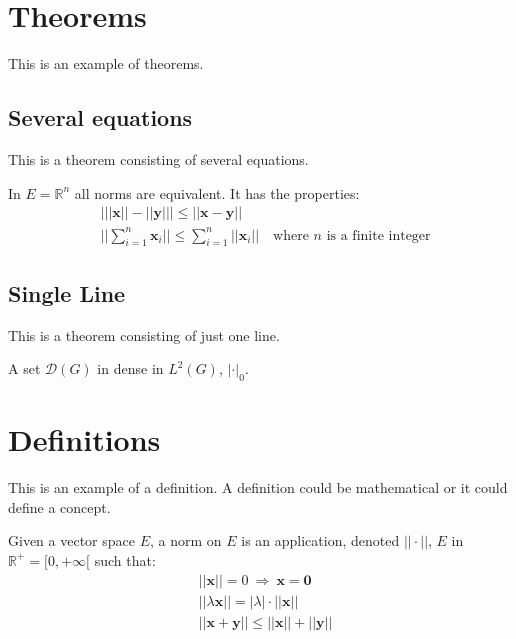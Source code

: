 \documentclass[11pt,fleqn]{book} %
\begin{document}
\section{Theorems}

This is an example of theorems.

\subsection{Several equations}
This is a theorem consisting of several equations.

\begin{theorem}
In $E=\mathbb{R}^n$ all norms are equivalent. It has the properties:
\begin{align}
& \big| ||\mathbf{x}|| - ||\mathbf{y}|| \big|\leq || \mathbf{x}- \mathbf{y}||\\
&  ||\sum_{i=1}^n\mathbf{x}_i||\leq \sum_{i=1}^n||\mathbf{x}_i||\quad\text{where $n$ is a finite integer}
\end{align}
\end{theorem}

\subsection{Single Line}
This is a theorem consisting of just one line.

\begin{theorem}
A set $\mathcal{D}(G)$ in dense in $L^2(G)$, $|\cdot|_0$. 
\end{theorem}


\section{Definitions}

This is an example of a definition. A definition could be mathematical or it could define a concept.

\begin{definition}
Given a vector space $E$, a norm on $E$ is an application, denoted $||\cdot||$, $E$ in $\mathbb{R}^+=[0,+\infty[$ such that:
\begin{align}
& ||\mathbf{x}||=0\ \Rightarrow\ \mathbf{x}=\mathbf{0}\\
& ||\lambda \mathbf{x}||=|\lambda|\cdot ||\mathbf{x}||\\
& ||\mathbf{x}+\mathbf{y}||\leq ||\mathbf{x}||+||\mathbf{y}||
\end{align}
\end{definition}
\end{document}
